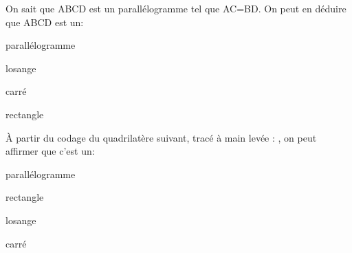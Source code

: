 \begin{QCM}
\begin{GroupeQCM}
\begin{exercice}
     On sait que ABCD est un parallélogramme tel que AC=BD. On peut en déduire que ABCD est un:
      \begin{ChoixQCM}{4}
      \item parallélogramme
      \item losange
      \item carré
      \item rectangle
      \end{ChoixQCM}
\begin{corrige}
   \end{corrige}
    \end{exercice}

\begin{exercice}
À partir du codage du quadrilatère suivant, tracé à main levée : \hspace{0.5em} \raisebox{-0.5\height}{}, on peut affirmer que c'est un:
      \begin{ChoixQCM}{4}
      \item parallélogramme
      \item rectangle
      \item losange
      \item carré
      \end{ChoixQCM}
\begin{corrige}
   \end{corrige}
    \end{exercice}
    
\end{GroupeQCM}
\end{QCM}

